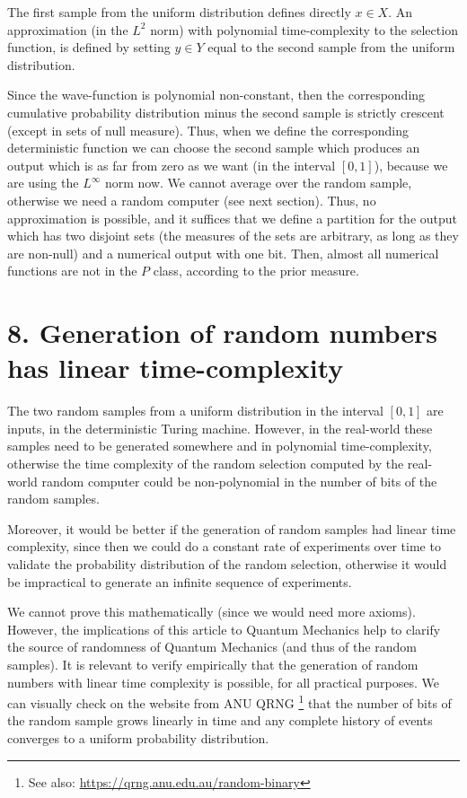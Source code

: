 \documentclass[11pt,a4paper]{report}
\begin{document}
The first sample from the uniform distribution defines directly
\(x\in X\). An approximation (in the \(L^2\) norm) with polynomial
time-complexity to the selection function, is defined by setting
\(y\in Y\) equal to the second sample from the uniform distribution.

Since the wave-function is polynomial non-constant, then the
corresponding cumulative probability distribution minus the second
sample is strictly crescent (except in sets of null measure). Thus, when
we define the corresponding deterministic function we can choose the
second sample which produces an output which is as far from zero as we
want (in the interval \([0,1]\)), because we are using the \(L^\infty\)
norm now. We cannot average over the random sample, otherwise we need a
random computer (see next section). Thus, no approximation is possible,
and it suffices that we define a partition for the output which has two
disjoint sets (the measures of the sets are arbitrary, as long as they
are non-null) and a numerical output with one bit. Then, almost all
numerical functions are not in the \(P\) class, according to the prior
measure.

\hypertarget{generation-of-random-numbers-has-linear-time-complexity}{%
\section{8. Generation of random numbers has linear
time-complexity}\label{generation-of-random-numbers-has-linear-time-complexity}}

The two random samples from a uniform distribution in the interval
\([0,1]\) are inputs, in the deterministic Turing machine. However, in
the real-world these samples need to be generated somewhere and in
polynomial time-complexity, otherwise the time complexity of the random
selection computed by the real-world random computer could be
non-polynomial in the number of bits of the random samples.

Moreover, it would be better if the generation of random samples had
linear time complexity, since then we could do a constant rate of
experiments over time to validate the probability distribution of the
random selection, otherwise it would be impractical to generate an
infinite sequence of experiments.

We cannot prove this mathematically (since we would need more axioms).
However, the implications of this article to Quantum Mechanics help to
clarify the source of randomness of Quantum Mechanics (and thus of the
random samples). It is relevant to verify empirically that the
generation of random numbers with linear time complexity is possible,
for all practical purposes. We can visually check on the website from
ANU QRNG \footnote{See also: \url{https://qrng.anu.edu.au/random-binary}}
that the number of bits of the random sample grows linearly in time and
any complete history of events converges to a uniform probability
distribution.
\end{document}
